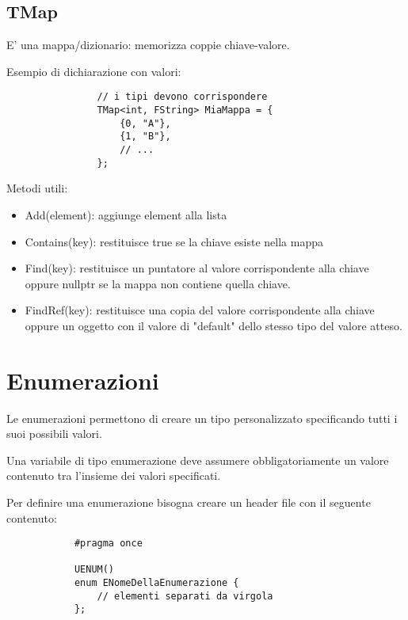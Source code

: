        \subsection{TMap}
            E' una mappa/dizionario: memorizza coppie chiave-valore.

            Esempio di dichiarazione con valori:
            \begin{verbatim}
                // i tipi devono corrispondere
                TMap<int, FString> MiaMappa = {
                    {0, "A"},
                    {1, "B"},
                    // ...
                };
            \end{verbatim}

            Metodi utili:
            \begin{itemize}
                \item Add(element): aggiunge element alla lista
                \item Contains(key): restituisce true se la chiave esiste nella mappa
                \item Find(key): restituisce un puntatore al valore corrispondente alla chiave oppure nullptr se la mappa non contiene quella chiave.
                \item FindRef(key): restituisce una copia del valore corrispondente alla chiave oppure un oggetto con il valore di "default" dello stesso tipo del valore atteso.
            \end{itemize}


    \section{Enumerazioni}
        Le enumerazioni permettono di creare un tipo personalizzato specificando tutti i suoi possibili valori.

        Una variabile di tipo enumerazione deve assumere obbligatoriamente un valore contenuto tra l'insieme dei valori specificati.

        Per definire una enumerazione bisogna creare un header file con il seguente contenuto:

        \begin{verbatim}
            #pragma once

            UENUM()
            enum ENomeDellaEnumerazione {
                // elementi separati da virgola
            };
        \end{verbatim}

